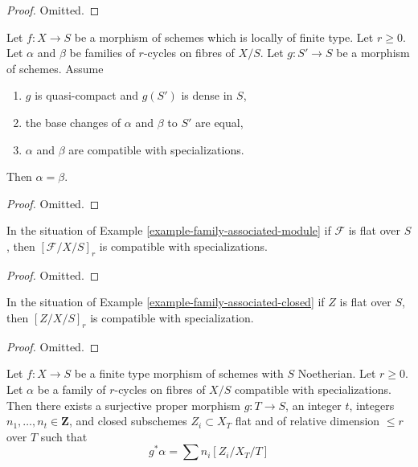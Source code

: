 \begin{proof}
Omitted.
\end{proof}

\begin{lemma}
\label{lemma-uniqueness-extension}
Let $f : X \to S$ be a morphism of schemes which is locally of finite type.
Let $r \geq 0$.
Let $\alpha$ and $\beta$ be families of $r$-cycles on fibres of $X/S$.
Let $g : S' \to S$ be a morphism of schemes. Assume
\begin{enumerate}
\item $g$ is quasi-compact and $g(S')$ is dense in $S$,
\item the base changes of $\alpha$ and $\beta$ to $S'$ are equal,
\item $\alpha$ and $\beta$ are compatible with specializations.
\end{enumerate}
Then $\alpha = \beta$.
\end{lemma}

\begin{proof}
Omitted.
\end{proof}

\begin{lemma}
\label{lemma-family-associated-module-specialization}
In the situation of Example \ref{example-family-associated-module}
if $\mathcal{F}$ is flat over $S$, then $[\mathcal{F}/X/S]_r$
is compatible with specializations.
\end{lemma}

\begin{proof}
Omitted.
\end{proof}

\begin{lemma}
\label{lemma-family-associated-closed-specialization}
In the situation of Example \ref{example-family-associated-closed}
if $Z$ is flat over $S$, then $[Z/X/S]_r$ is compatible with
specialization.
\end{lemma}

\begin{proof}
Omitted.
\end{proof}

\begin{lemma}
\label{lemma-get-cycles}
Let $f : X \to S$ be a finite type morphism of schemes with $S$ Noetherian.
Let $r \geq 0$. Let $\alpha$ be a family of $r$-cycles on fibres of $X/S$
compatible with specializations. Then there exists a surjective proper
morphism $g : T \to S$, an integer $t$, integers
$n_1, \ldots, n_t \in \mathbf{Z}$, and closed subschemes
$Z_i \subset X_T$ flat and of relative dimension $\leq r$ over $T$ such that
$$
g^*\alpha = \sum n_i [Z_i/X_T/T]
$$
\end{lemma}

